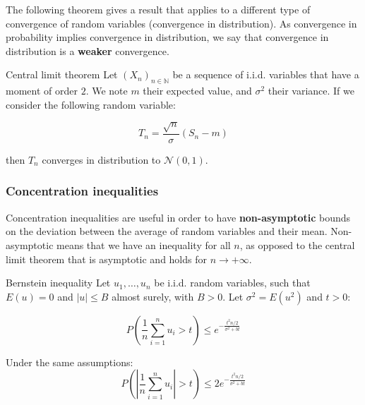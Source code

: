 \documentclass[
10pt, %
a4paper, %
oneside, %
headinclude,footinclude, %
BCOR5mm, %
]{scrartcl}
\begin{document}
The following theorem gives a result that applies to a different type of 
convergence of random variables (convergence in distribution). As convergence
in probability implies convergence in distribution, we say that convergence in
distribution is a \textbf{{weaker}} convergence.

\begin{theorem}{Central limit theorem}
    Let $(X_n)_{n\in \mathbb{N} }$ be a sequence of i.i.d. variables that have
    a moment of order $2$. We note $m$ their expected value, and $ \sigma^2$
    their variance. If we consider the following random variable:

    \begin{equation}
        T_n = \frac{ \sqrt{n} }{\sigma} (S_n-m)
    \end{equation}

    then $T_n$ converges in distribution to $ \mathcal{N}(0, 1)$.
\end{theorem}


\subsubsection{\large\color{Periwinkle}Concentration inequalities}

Concentration inequalities are useful in order to have \textbf{{non-asymptotic }} bounds on the deviation between the average of random variables and their mean. Non-asymptotic means that we have an inequality for all $n$, as opposed to the central limit theorem that is asymptotic and holds for $n\rightarrow+\infty$.

\begin{theorem}{Bernstein inequality}
Let $u_1, \dots, u_n$ be i.i.d. random variables, such that $E(u)=0$ and $|u|\leq B$ almost surely, with $B>0$. Let $ \sigma^2=E(u^2)$ and $t>0$:

\begin{equation*}
    P( \frac{1}{n} \sum^{n}_{i=1} u_i >t)\leq e^{ - \frac{t^2n/2}{\sigma^2+bt} }
\end{equation*}
\end{theorem}

\begin{corollary}
    Under the same assumptions:
\begin{equation*}
    P( |\frac{1}{n} \sum^{n}_{i=1} u_i |>t)\leq 2e^{ - \frac{t^2n/2}{\sigma^2+bt} }
\end{equation*}
    
\end{corollary}
\end{document}
